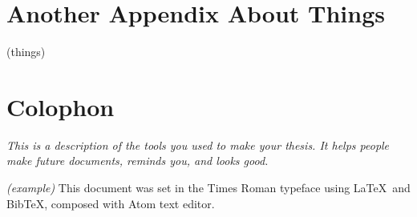 \chapter{Another Appendix About Things}
\label{appendixlabel2}
(things)

\chapter{Colophon}
\label{appendixlabel3}
\textit{This is a description of the tools you used to make your thesis. It helps people make future documents, reminds you, and looks good.}

\textit{(example)} This document was set in the Times Roman typeface using \LaTeX\ and Bib\TeX , composed with Atom text editor.

